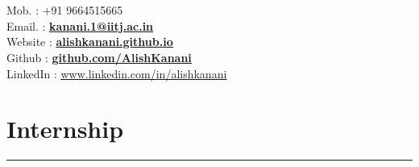 \documentclass[]{resume}
\begin{document}
\hfill
\begin{minipage}[t]{0.66\textwidth} 
\vspace{-2em}
\hspace*{1pt}\hfill    \\
\hspace*{1pt}\hfill    \\
\hspace*{1pt}\hfill Mob. : +91 9664515665\\ 
\hspace*{1pt}\hfill Email. : \textbf{\href{mailto:kanani.1@iitj.ac.in}{\underline{kanani.1@iitj.ac.in}}} \\
\hspace*{1pt}\hfill Website : \textbf{\href{http://alishkanani.github.io}{\underline{alishkanani.github.io}}} \\
\hspace*{1pt}\hfill Github : \textbf{\href{https://github.com/AlishKanani}{\underline{github.com/AlishKanani}}}\\
\hspace*{1pt}\hfill 
LinkedIn : {\href{https://www.linkedin.com/in/alishkanani}{\underline{www.linkedin.com/in/alishkanani}}} \\

\vspace{-2em}
\section{Internship}
\vspace{-0.5em}
\noindent\rule{12.5cm}{0.4pt}


\end{minipage}
\end{document}
